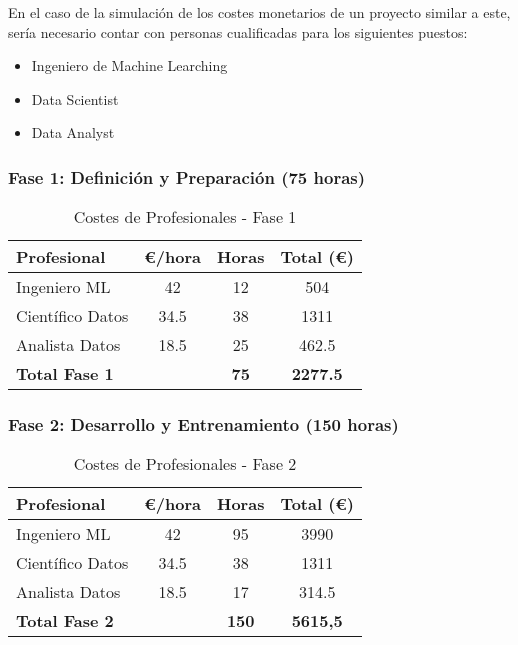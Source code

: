 En el caso de la simulación de los costes monetarios de un proyecto similar a este, sería necesario contar con personas cualificadas para los siguientes puestos:
\begin{itemize}
\item Ingeniero de Machine Learching
\item Data Scientist
\item Data Analyst
\end{itemize}


\subsubsection*{Fase 1: Definición y Preparación (75 horas)}
\begin{table}[H]
\centering
\begin{tabular}{lccc}
\toprule
Profesional & €/hora & Horas & Total (€) \\
\midrule
Ingeniero ML & 42 & 12 & 504 \\
Científico Datos & 34.5 & 38 & 1311 \\
Analista Datos & 18.5 & 25 & 462.5 \\
\midrule
\textbf{Total Fase 1} & & \textbf{75} & \textbf{2277.5} \\
\bottomrule
\end{tabular}
\caption{Costes de Profesionales - Fase 1}
\label{tab:costes_fase1}
\end{table}


\subsubsection*{Fase 2: Desarrollo y Entrenamiento (150 horas)}
\begin{table}[H]
\centering
\begin{tabular}{lccc}
\toprule
Profesional & €/hora & Horas & Total (€) \\
\midrule
Ingeniero ML & 42 & 95 & 3990 \\
Científico Datos & 34.5 & 38 & 1311 \\
Analista Datos & 18.5 & 17 & 314.5 \\
\midrule
\textbf{Total Fase 2} & & \textbf{150} & \textbf{5615,5} \\
\bottomrule
\end{tabular}
\caption{Costes de Profesionales - Fase 2}
\label{tab:costes_fase2}
\end{table}


